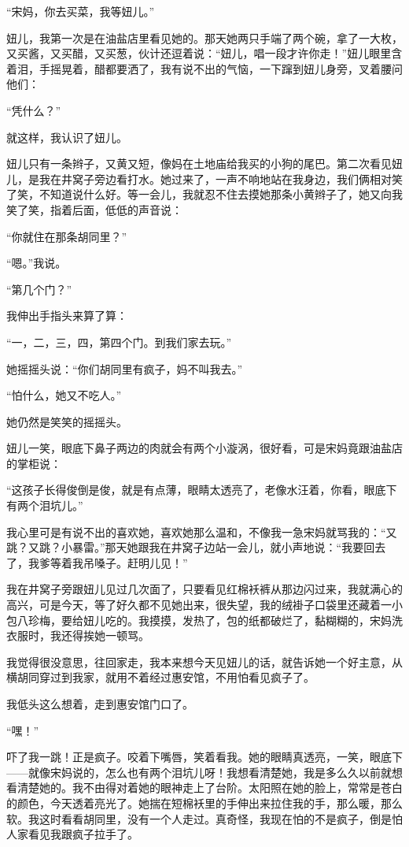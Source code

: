 \par “宋妈，你去买菜，我等妞儿。”
\par 妞儿，我第一次是在油盐店里看见她的。那天她两只手端了两个碗，拿了一大枚，又买酱，又买醋，又买葱，伙计还逗着说：“妞儿，唱一段才许你走！”妞儿眼里含着泪，手摇晃着，醋都要洒了，我有说不出的气恼，一下蹿到妞儿身旁，叉着腰问他们：
\par “凭什么？”
\par 就这样，我认识了妞儿。
\par 妞儿只有一条辫子，又黄又短，像妈在土地庙给我买的小狗的尾巴。第二次看见妞儿，是我在井窝子旁边看打水。她过来了，一声不响地站在我身边，我们俩相对笑了笑，不知道说什么好。等一会儿，我就忍不住去摸她那条小黄辫子了，她又向我笑了笑，指着后面，低低的声音说：
\par “你就住在那条胡同里？”
\par “嗯。”我说。
\par “第几个门？”
\par 我伸出手指头来算了算：
\par “一，二，三，四，第四个门。到我们家去玩。”
\par 她摇摇头说：“你们胡同里有疯子，妈不叫我去。”
\par “怕什么，她又不吃人。”
\par 她仍然是笑笑的摇摇头。
\par 妞儿一笑，眼底下鼻子两边的肉就会有两个小漩涡，很好看，可是宋妈竟跟油盐店的掌柜说：
\par “这孩子长得俊倒是俊，就是有点薄，眼睛太透亮了，老像水汪着，你看，眼底下有两个泪坑儿。”
\par 我心里可是有说不出的喜欢她，喜欢她那么温和，不像我一急宋妈就骂我的：“又跳？又跳？小暴雷。”那天她跟我在井窝子边站一会儿，就小声地说：“我要回去了，我爹等着我吊嗓子。赶明儿见！”
\par 我在井窝子旁跟妞儿见过几次面了，只要看见红棉袄裤从那边闪过来，我就满心的高兴，可是今天，等了好久都不见她出来，很失望，我的绒褂子口袋里还藏着一小包八珍梅，要给妞儿吃的。我摸摸，发热了，包的纸都破烂了，黏糊糊的，宋妈洗衣服时，我还得挨她一顿骂。
\par 我觉得很没意思，往回家走，我本来想今天见妞儿的话，就告诉她一个好主意，从横胡同穿过到我家，就用不着经过惠安馆，不用怕看见疯子了。
\par 我低头这么想着，走到惠安馆门口了。
\par “嘿！”
\par 吓了我一跳！正是疯子。咬着下嘴唇，笑着看我。她的眼睛真透亮，一笑，眼底下——就像宋妈说的，怎么也有两个泪坑儿呀！我想看清楚她，我是多么久以前就想看清楚她的。我不由得对着她的眼神走上了台阶。太阳照在她的脸上，常常是苍白的颜色，今天透着亮光了。她揣在短棉袄里的手伸出来拉住我的手，那么暖，那么软。我这时看看胡同里，没有一个人走过。真奇怪，我现在怕的不是疯子，倒是怕人家看见我跟疯子拉手了。
